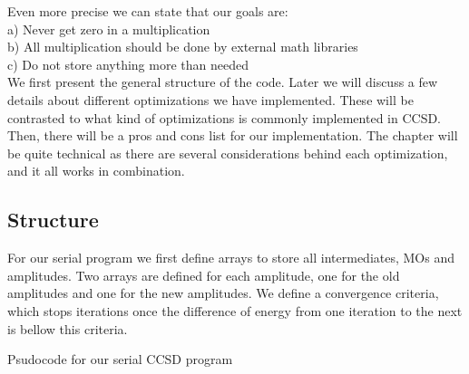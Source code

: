 \documentclass[a4paper,norsk,11pt,twoside]{report}
\begin{document}
Even more precise we can state that our goals are: \\
a) Never get zero in a multiplication\\
b) All multiplication should be done by external math libraries\\
c) Do not store anything more than needed\\

We first present the general structure of the code. Later we will discuss a few details about different optimizations we have implemented. These will be contrasted to what kind of optimizations is commonly implemented in CCSD. Then, there will be a pros and cons list for our implementation. The chapter will be quite technical as there are several considerations behind each optimization, and it all works in combination. 

\newpage

\subsection{Structure}

For our serial program we first define arrays to store all intermediates, MOs and amplitudes. Two arrays are defined for each amplitude, one for the old amplitudes and one for the new amplitudes. We define a convergence criteria, which stops iterations once the difference of energy from one iteration to the next is bellow this criteria. \\

\begin{algorithm}[H]
 \caption{Psudocode for our serial CCSD program}
 \label{CCSD_STRUCTURE_SERIAL}
\end{algorithm}
\end{document}

